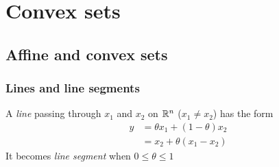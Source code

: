 \chapter{Convex sets}

\section{Affine and convex sets}

\subsection{Lines and line segments}
A \textit{line} passing through $x_1$ and $x_2$ on $\mathbb{R}^n$ ($x_1\ne x_2$) has the form
\begin{align*}
  y &= \theta x_1+(1-\theta)x_2\\
    &= x_2+\theta(x_1-x_2)
\end{align*}
It becomes \textit{line segment} when $0\le\theta\le1$

